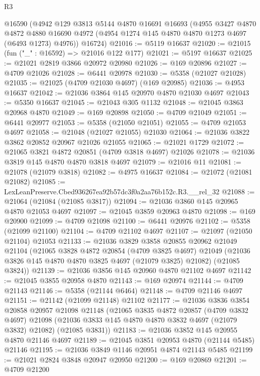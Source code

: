 \begin{lexlean}{R3}
\begin{coremodule}
    @16590
    (@4942
      @129
      @3813
      @5144
      @4870
      @16691
      @16693
      (@4955
        @3427
        @4870
        @4872
        @4880
        @16690
        @4972
        (@4954 @1274 @145 @4870 @4870 @1273 @4697 (@6493 @1273) @4976))
      @16724)
@21016 := @5119 @16637
@21020 := @21015 (fun ("_" : @16592) => @21016 @122 @177)
@21021 := @5197 @16637
@21025 := @21021 @2819 @3866 @20972 @20980
@21026 := @169 @20896
@21027 := @4709 @21026
@21028 := @6441 @20978
@21030 := @5358 (@21027 @21028)
@21035 := @21025 (@4709 @21030 @4697) (@169 @20985)
@21036 := @4953 @16637
@21042 := @21036 @3864 @145 @20970 @4870 @21030 @4697
@21043 := @5350 @16637
@21045 := @21043 @305 @1132
@21048 := @21045 @3863 @20968 @4870
@21049 := @169 @20898
@21050 := @4709 @21049
@21051 := @6441 @20977
@21053 := @5358 (@21050 @21051)
@21055 := @4709 @21053 @4697
@21058 := @21048 (@21027 @21055) @21030
@21064 := @21036 @3822 @3862 @20852 @20967 @21026 @21055
@21065 := @21021 @1729
@21072 := @21065 @3821 @4872 @20851 (@4709 @3818 @4697) @21026
@21078 := @21036 @3819 @145 @4870 @4870 @3818 @4697
@21079 := @21016 @11
@21081 := @21078 (@21079 @3818)
@21082 := @4975 @16637
@21084 := @21072 (@21081 @21082)
@21085 := LexLeanPreserve.Cbed936267ea92b57dc3f0a2aa76b152c.R3.__rel_32
@21088 := @21064 (@21084 (@21085 @3817))
@21094 := @21036 @3860 @145 @20965 @4870 @21053 @4697
@21097 := @21045 @3859 @20963 @4870
@21098 := @169 @20900
@21099 := @4709 @21098
@21100 := @6441 @20976
@21102 := @5358 (@21099 @21100)
@21104 := @4709 @21102 @4697
@21107 := @21097 (@21050 @21104) @21053
@21133 := @21036
    @3829
    @3858
    @20855
    @20962
    @21049
    @21104
    (@21065
      @3828
      @4872
      @20854
      (@4709 @3825 @4697)
      @21049
      (@21036 @3826 @145 @4870 @4870 @3825 @4697 (@21079 @3825) @21082)
      (@21085 @3824))
@21139 := @21036 @3856 @145 @20960 @4870 @21102 @4697
@21142 := @21045 @3855 @20958 @4870
@21143 := @169 @20974
@21144 := @4709 @21143
@21146 := @5358 (@21144 @6464)
@21148 := @4709 @21146 @4697
@21151 := @21142 (@21099 @21148) @21102
@21177 := @21036
    @3836
    @3854
    @20858
    @20957
    @21098
    @21148
    (@21065
      @3835
      @4872
      @20857
      (@4709 @3832 @4697)
      @21098
      (@21036 @3833 @145 @4870 @4870 @3832 @4697 (@21079 @3832) @21082)
      (@21085 @3831))
@21183 := @21036 @3852 @145 @20955 @4870 @21146 @4697
@21189 := @21045 @3851 @20953 @4870 (@21144 @5485) @21146
@21195 := @21036 @3849 @1146 @20951 @4874 @21143 @5485
@21199 := @21021 @2824 @3848 @20947 @20950
@21200 := @169 @20869
@21201 := @4709 @21200

\end{coremodule}
\end{lexlean}

